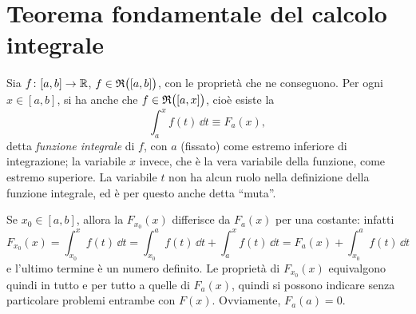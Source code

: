 \section{Teorema fondamentale del calcolo integrale}
\begin{definizione} \label{d:f-integrale}
Sia $f\colon[a,b]\to\mathbb{R}$, $f\in\mathfrak{R}\big([a,b]\big)$, con le proprietà che ne conseguono. Per ogni $x\in[a,b]$, si ha anche che $f\in\mathfrak{R}\big([a,x]\big)$, cioè esiste la
\[
\int_a^xf(t)\,\dd t\equiv F_a(x),
\]
detta \emph{funzione integrale} di $f$, con $a$ (fissato) come estremo inferiore di integrazione; la variabile $x$ invece, che è la vera variabile della funzione, come estremo superiore. La variabile $t$ non ha alcun ruolo nella definizione della funzione integrale, ed è per questo anche detta ``muta''.
\end{definizione}
Se $x_0\in[a,b]$, allora la $F_{x_0}(x)$ differisce da $F_a(x)$ per una costante: infatti
\[
F_{x_0}(x)=\int_{x_0}^xf(t)\,\dd t=\int_{x_0}^af(t)\,\dd t+\int_a^xf(t)\,\dd t=F_a(x)+\int_{x_0}^af(t)\,\dd t
\]
e l'ultimo termine è un numero definito.
Le proprietà di $F_{x_0}(x)$ equivalgono quindi in tutto e per tutto a quelle di $F_a(x)$, quindi si possono indicare senza particolare problemi entrambe con $F(x)$.
Ovviamente, $F_a(a)=0$.

